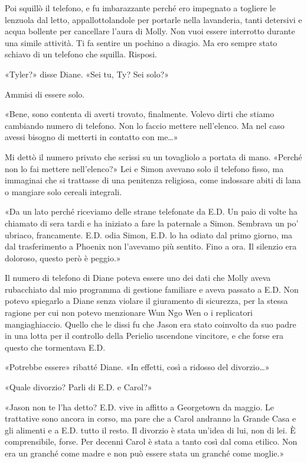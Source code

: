 Poi squillò il telefono, e fu imbarazzante perché ero impegnato a
togliere le lenzuola dal letto, appallottolandole per portarle nella
lavanderia, tanti detersivi e acqua bollente per cancellare l'aura di
Molly. Non vuoi essere interrotto durante una simile attività. Ti fa
sentire un pochino a disagio. Ma ero sempre stato schiavo di un telefono
che squilla. Risposi.

«Tyler?» disse Diane. «Sei tu, Ty? Sei solo?»

Ammisi di essere solo.

«Bene, sono contenta di averti trovato, finalmente. Volevo dirti che
stiamo cambiando numero di telefono. Non lo faccio mettere nell'elenco.
Ma nel caso avessi bisogno di metterti in contatto con me\ldots»

Mi dettò il numero privato che scrissi su un tovagliolo a portata di
mano. «Perché non lo fai mettere nell'elenco?» Lei e Simon avevano solo
il telefono fisso, ma immaginai che si trattasse di una penitenza
religiosa, come indossare abiti di lana o mangiare solo cereali
integrali.

«Da un lato perché riceviamo delle strane telefonate da E.D. Un paio di
volte ha chiamato di sera tardi e ha iniziato a fare la paternale a
Simon. Sembrava un po' ubriaco, francamente. E.D. odia Simon, E.D. lo ha
odiato dal primo giorno, ma dal trasferimento a Phoenix non l'avevamo
più sentito. Fino a ora. Il silenzio era doloroso, questo però è
peggio.»

Il numero di telefono di Diane poteva essere uno dei dati che Molly
aveva rubacchiato dal mio programma di gestione familiare e aveva
passato a E.D. Non potevo spiegarlo a Diane senza violare il giuramento
di sicurezza, per la stessa ragione per cui non potevo menzionare Wun
Ngo Wen o i replicatori mangiaghiaccio. Quello che le dissi fu che Jason
era stato coinvolto da suo padre in una lotta per il controllo della
Perielio uscendone vincitore, e che forse era questo che tormentava E.D.

«Potrebbe essere» ribatté Diane. «In effetti, così a ridosso del
divorzio\ldots»

«Quale divorzio? Parli di E.D. e Carol?»

«Jason non te l'ha detto? E.D. vive in affitto a Georgetown da maggio.
Le trattative sono ancora in corso, ma pare che a Carol andranno la
Grande Casa e gli alimenti e a E.D. tutto il resto. Il divorzio è stata
un'idea di lui, non di lei. È comprensibile, forse. Per decenni Carol è
stata a tanto così dal coma etilico. Non era un granché come madre e non
può essere stata un granché come moglie.»

